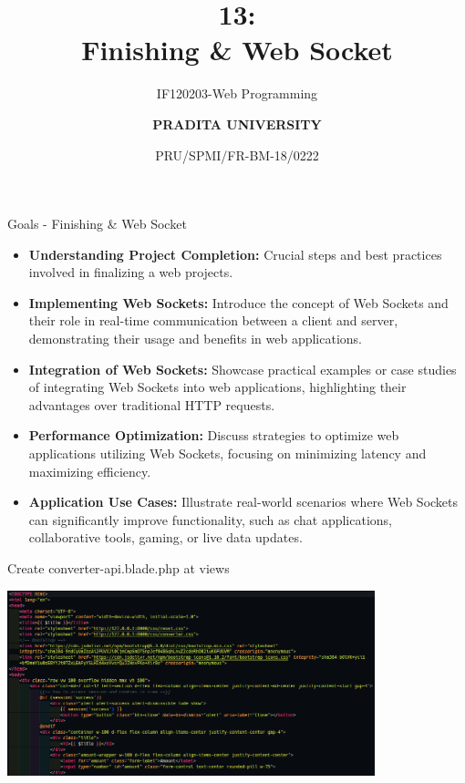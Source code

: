 \documentclass[aspectratio=169, table]{beamer}
\subtitle{IF120203-Web Programming}
\title{\Huge {\textbf{13: \\Finishing \& Web Socket}}}
\date[Serial]{\scriptsize {PRU/SPMI/FR-BM-18/0222}}
\author[Pradita]{\small {\textbf{PRADITA UNIVERSITY}}}
\begin{document}
\begin{frame}
    \titlepage
\end{frame}

\begin{frame}{Goals - Finishing \& Web Socket}
    \vskip1cm
    \begin{itemize}
        \item \textbf{Understanding Project Completion:} Crucial steps and best practices involved in finalizing a web projects.
        \item \textbf{Implementing Web Sockets:} Introduce the concept of Web Sockets and their role in real-time communication between a client and server, demonstrating their usage and benefits in web applications.
        \item \textbf{Integration of Web Sockets:} Showcase practical examples or case studies of integrating Web Sockets into web applications, highlighting their advantages over traditional HTTP requests.
        \item \textbf{Performance Optimization:} Discuss strategies to optimize web applications utilizing Web Sockets, focusing on minimizing latency and maximizing efficiency.
        \item \textbf{Application Use Cases:} Illustrate real-world scenarios where Web Sockets can significantly improve functionality, such as chat applications, collaborative tools, gaming, or live data updates.
    \end{itemize}
\end{frame}


\begin{frame}{Create converter-api.blade.php at views}
    \vskip1cm
    \begin{center}
        \includegraphics[width=0.8\textwidth]{classFiles/pertemuan-13-converter-api-part-1.png}
    \end{center}
\end{frame}
\end{document}
